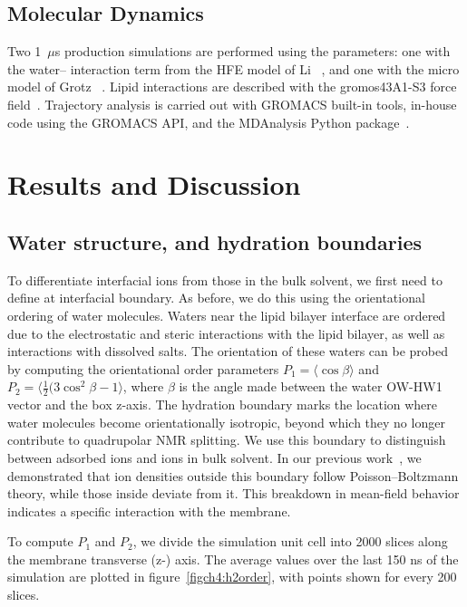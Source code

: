 \subsection{Molecular Dynamics}

Two 1~$\mu$s production simulations are performed using the 
parameters: one with the water--\mg{} interaction term from the HFE
model of Li \etal~\cite{merzhfe}, and one with the \mg{} micro model of
Grotz \etal~\cite{grotz:2021:optimized,micro}. Lipid interactions are
described with the gromos43A1-S3 force field~\cite{chiu:2009}.
Trajectory analysis is carried out with GROMACS built-in tools,
in-house code using the GROMACS API, and the MDAnalysis Python
package~\cite{mdanalysis1,mdanalysis2}.

\section{Results and Discussion}

\subsection{Water structure, and hydration boundaries}
To differentiate interfacial ions from those in the bulk solvent, we first need to define at interfacial boundary. As before\cite{saunders:2024}, we do this using the orientational ordering of water molecules. Waters near the lipid bilayer interface are ordered due to the electrostatic and steric interactions with the lipid bilayer, as well as interactions with dissolved salts. The
orientation of these waters can be probed by computing the orientational order parameters $P_1=\langle\cos{\beta}\rangle$ and $P_2=\langle{\frac{1}{2}(3\cos^{2}{\beta}-1}\rangle$, where $\beta$ is the angle made between the water OW-HW1 vector and the box z-axis. The hydration boundary marks the location where water molecules become orientationally isotropic, beyond which they no longer contribute to quadrupolar NMR splitting. We use this boundary to distinguish between adsorbed ions and ions in bulk solvent. In our previous work~\cite{saunders:2024}, we demonstrated that ion densities outside this boundary follow Poisson–Boltzmann theory, while those inside deviate from it. This breakdown in mean-field behavior indicates a specific interaction with the membrane. 

To compute $P_1$ and $P_2$, we divide the simulation unit cell into 2000 slices along the membrane transverse (z-) axis.  
The average values over the last 150 ns of the simulation are plotted in figure~\ref{figch4:h2order}, with points shown for every 200 slices. 

